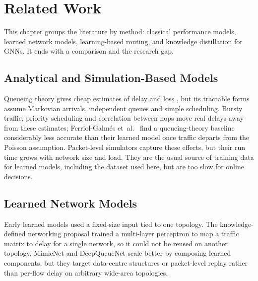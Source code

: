 \chapter{Related Work}
\label{ch:related}

This chapter groups the literature by method: classical performance models, learned network models, learning-based routing, and knowledge distillation for GNNs. It ends with a comparison and the research gap.

\section{Analytical and Simulation-Based Models}

Queueing theory gives cheap estimates of delay and loss \cite{kleinrock1975queueing}, but its tractable forms assume Markovian arrivals, independent queues and simple scheduling. Bursty traffic, priority scheduling and correlation between hops move real delays away from these estimates; Ferriol-Galm\'es et~al.\ \cite{ferriolgalmes2023routenetfermi} find a queueing-theory baseline considerably less accurate than their learned model once traffic departs from the Poisson assumption. Packet-level simulators \cite{varga2001omnet,riley2010ns3} capture these effects, but their run time grows with network size and load. They are the usual source of training data for learned models, including the dataset used here, but are too slow for online decisions.

\section{Learned Network Models}

Early learned models used a fixed-size input tied to one topology. The knowledge-defined networking proposal \cite{mestres2017kdn} trained a multi-layer perceptron to map a traffic matrix to delay for a single network, so it could not be reused on another topology. MimicNet \cite{zhang2021mimicnet} and DeepQueueNet \cite{yang2022deepqueuenet} scale better by composing learned components, but they target data-centre structures or packet-level replay rather than per-flow delay on arbitrary wide-area topologies.

